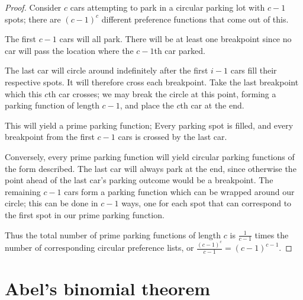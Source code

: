 \documentclass[12 pt]{amsart}
\theoremstyle{definition} %
\theoremstyle{remark} %
\begin{document}
\begin{proof}
    Consider $c$ cars attempting to park in a circular parking lot with $c-1$ spots; there are $(c-1)^c$ different preference functions that come out of this.
    
    The first $c-1$ cars will all park. There will be at least one breakpoint since no car will pass the location where the $c-1$th car parked. 

    The last car will circle around indefinitely after the first $i-1$ cars fill their respective spots. It will therefore cross each breakpoint. Take the last breakpoint which this $c$th car crosses; we may break the circle at this point, forming a parking function of length $c-1$, and place the $c$th car at the end.

    This will yield a prime parking function; Every parking spot is filled, and every breakpoint from the first $c-1$ cars is crossed by the last car.
    
    Conversely, every prime parking function will yield circular parking functions of the form described. The last car will always park at the end, since otherwise the point ahead of the last car's parking outcome would be a breakpoint. The remaining $c-1$ cars form a parking function which can be wrapped around our circle; this can be done in $c-1$ ways, one for each spot that can correspond to the first spot in our prime parking function.

    Thus the total number of prime parking functions of length $c$ is $\frac{1}{c-1}$ times the number of corresponding circular preference lists, or $\frac{(c-1)^c}{c-1}=(c-1)^{c-1}$.
\end{proof}

\section{Abel's binomial theorem} \label{a:abelsbin}


\abelsbin*
\end{document}
